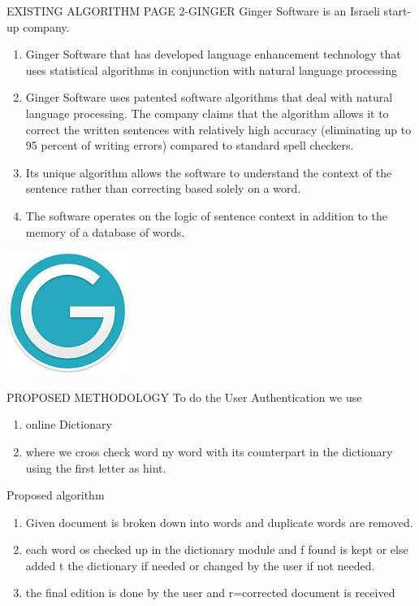 \documentclass{beamer}
\begin{document}
\begin{frame}{EXISTING ALGORITHM PAGE 2-GINGER}
 Ginger Software is an Israeli start-up company.
 \begin{enumerate}
 
 \item Ginger Software that has developed language enhancement technology that uses statistical algorithms in conjunction with natural language processing

\item Ginger Software uses patented software algorithms that deal with natural language processing. The company claims that the algorithm allows it to correct the written sentences with relatively high accuracy (eliminating up to 95 percent of writing errors) compared to standard spell checkers. \item Its unique algorithm allows the software to understand the context of the sentence rather than correcting based solely on a word. 
\item The software operates on the logic of sentence context in addition to the memory of a database of words.

\end{enumerate}

\end{frame}
\begin{frame}
\includegraphics[scale=0.5]{ginger.jpeg} 
\end{frame}



\begin{frame}{PROPOSED METHODOLOGY}
To do the User Authentication we use
\begin{enumerate}
\item online Dictionary
\item where we cross check word ny word with its counterpart in the dictionary using the first letter as hint.
\end{enumerate}
\end{frame}
\begin{frame}{Proposed algorithm}
 \begin{enumerate}
 
 \item Given document is broken down into words and duplicate words are removed.
\item each word os checked up in the dictionary module and f found is kept or else added t the dictionary if needed or changed by the user if not needed. 
\item the final edition is done by the user and r=corrected document is received

\end{enumerate}

\end{frame}
\end{document}
